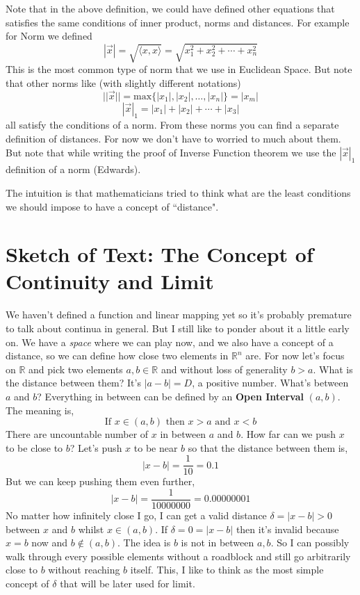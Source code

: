 \documentclass[letter]{article}
\begin{document}
Note that in the above definition, we could have defined other equations that satisfies the same conditions of inner product, norms and distances. For example for Norm we defined 
\[
| \vec{x} | = \sqrt{\langle x, x \rangle}  = \sqrt{x_1^2 + x_2^2 + \cdots + x_n^2} 
\]
This is the most common type of norm that we use in Euclidean Space. But note that other norms like (with slightly different notations) 
\[
| | \vec{x} | | = \text{max} \{|x_1|, |x_2|, \ldots, |x_n|\}  = |x_m|  
\] 
\[
|\vec{x}|_1 = |x_1| + |x_2| + \cdots + |x_3|
\] 
all satisfy the conditions of a norm. From these norms you can find a separate definition of distances. For now we don't have to worried to much about them. But note that while writing the proof of Inverse Function theorem we use the $| \vec{x}| _1 $ definition of a norm (Edwards).  

\textsf{The intuition is that mathematicians tried to think what are the least conditions we should impose to have a concept of ``distance".}

\newpage
\section*{Sketch of Text: The Concept of Continuity and Limit} 
\textsf{We haven't defined a function and linear mapping yet so it's probably premature to talk about continua in general. But I still like to ponder about it a little early on. 
	\newline
We have a \emph{space} where we can play now, and we also have a concept of a distance, so we can define how close two elements in $\mathbb{R}^{n}$ are. For now let's focus on $\mathbb{R}$ and pick two elements $a,b \in \mathbb{R}$ and without loss of generality $b > a$. What is the distance between them? It's $|a - b| = D$, a positive number. What's between $a$ and $b$? Everything in between can be defined by an \textbf{Open Interval} $(a,b)$. The meaning is, 
\[
	\text{If } x \in (a,b) \text{ then } x > a \text{ and } x < b
\]
There are uncountable number of $x$ in between $a$ and $b$. How far can we push $x$ to be close to $b$? 
\newline
Let's push $x$ to be near $b$ so that the distance between them is, 
\[
|x - b| = \frac{1}{10} =  0.1
\]
But we can keep pushing them even further, 
\[
|x - b| = \frac{1}{10000000} = 0.00000001
\]
No matter how infinitely close I go, I can get a valid distance $\delta = |x - b| > 0$ between $x$ and $b$ whilst $x \in  (a,b)$. If $\delta = 0 = |x-b|$ then it's invalid because $x = b$ now and $b \not\in (a,b)$. The idea is $b$ is not in between $a,b$. So I can possibly walk through every possible elements without a roadblock and still go arbitrarily close to  $b$ without reaching $b$ itself. 
\newline
This, I like to think as the most simple concept of $\delta$ that will be later used for limit. 
}
\end{document}

